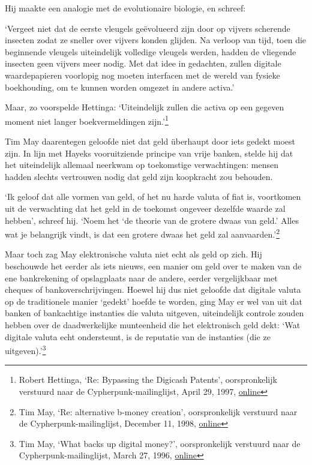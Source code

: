 \documentclass[
  a5paper,
  smalldemyvopaper,11pt,twoside,onecolumn,openright,extrafontsizes,
hidelinks]{memoir}
\begin{document}
Hij maakte een analogie met de evolutionaire biologie, en schreef:

`Vergeet niet dat de eerste vleugels geëvolueerd zijn door op vijvers
scherende insecten zodat ze sneller over vijvers konden glijden. Na
verloop van tijd, toen die beginnende vleugels uiteindelijk volledige
vleugels werden, hadden de vliegende insecten geen vijvers meer nodig.
Met dat idee in gedachten, zullen digitale waardepapieren voorlopig nog
moeten interfacen met de wereld van fysieke boekhouding, om te kunnen
worden omgezet in andere activa.'

Maar, zo voorspelde Hettinga: `Uiteindelijk zullen die activa op een
gegeven moment niet langer boekvermeldingen zijn.'\footnote{Robert
  Hettinga, `Re: Bypassing the Digicash Patents', oorspronkelijk
  verstuurd naar de Cypherpunk-mailinglijst, April 29, 1997,
  \href{https://cypherpunks.venona.com/date/1997/04/msg00811.html}{online}}

Tim May daarentegen geloofde niet dat geld überhaupt door iets gedekt
moest zijn. In lijn met Hayeks vooruitziende principe van vrije banken,
stelde hij dat het uiteindelijk allemaal neerkwam op toekomstige
verwachtingen: mensen hadden slechts vertrouwen nodig dat geld zijn
koopkracht zou behouden.

`Ik geloof dat alle vormen van geld, of het nu harde valuta of fiat is,
voortkomen uit de verwachting dat het geld in de toekomst ongeveer
dezelfde waarde zal hebben', schreef hij. `Noem het `de theorie van de
grotere dwaas van geld.' Alles wat je belangrijk vindt, is dat een
grotere dwaas het geld zal aanvaarden.'\footnote{Tim May, `Re:
  alternative b-money creation', oorspronkelijk verstuurd naar de
  Cypherpunk-mailinglijst, December 11, 1998,
  \href{https://cypherpunks.venona.com/date/1998/12/msg00455.html}{online}}

Maar toch zag May elektronische valuta niet echt als geld op zich. Hij
beschouwde het eerder als iets nieuws, een manier om geld over te maken
van de ene bankrekening of opslagplaats naar de andere, eerder
vergelijkbaar met cheques of bankoverschrijvingen. Hoewel hij dus niet
geloofde dat digitale valuta op de traditionele manier `gedekt' hoefde
te worden, ging May er wel van uit dat banken of bankachtige instanties
die valuta uitgeven, uiteindelijk controle zouden hebben over de
daadwerkelijke munteenheid die het elektronisch geld dekt: `Wat digitale
valuta echt ondersteunt, is de reputatie van de instanties (die ze
uitgeven).'\footnote{Tim May, `What backs up digital money?',
  oorspronkelijk verstuurd naar de Cypherpunk-mailinglijst, March 27,
  1996,
  \href{https://cypherpunks.venona.com/date/1996/03/msg01576.html}{online}}
\end{document}
